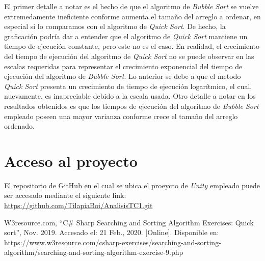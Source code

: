 \documentclass[conference]{IEEEtran}
\begin{document}
El primer detalle a notar es el hecho de que el algoritmo de \textit{Bubble Sort} se vuelve extremedamente ineficiente conforme
aumenta el tamaño del arreglo a ordenar, en especial si lo comparamos con el algoritmo de \textit{Quick Sort}. De hecho, la graficación
podría dar a entender que el algoritmo de \textit{Quick Sort} mantiene un tiempo de ejecución constante, pero este no es el caso. En realidad,
el crecimiento del tiempo de ejecución del algoritmo de \textit{Quick Sort} no se puede observar en las escalas requeridas para representar
el crecimiento exponencial del tiempo de ejecución del algoritmo de \textit{Bubble Sort}. Lo anterior se debe a que el metodo \textit{Quick Sort}
presenta un crecimiento de tiempo de ejecución logarítmico, el cual, nuevamente, es inapreciable debido a la escala usada.
Otro detalle a notar en los resultados obtenidos es que los tiempos de ejecución del algoritmo de \textit{Bubble Sort} empleado poseen 
una mayor varianza conforme crece el tamaño del arreglo ordenado.

\section{Acceso al proyecto}
El repositorio de GitHub en el cual se ubica el proeycto de \textit{Unity} empleado puede ser accesado mediante el siguiente link: \url{https://github.com/TilapiaBoi/AnalisisTC1.git}

\begin{thebibliography}{00}
 W3resource.com, ``C\# Sharp Searching and Sorting Algorithm Exercises: Quick sort'', Nov. 2019. Accesado el: 21 Feb., 2020. [Online]. Disponible en: https://www.w3resource.com/csharp-exercises/searching-and-sorting-algorithm/searching-and-sorting-algorithm-exercise-9.php
\end{thebibliography}
\end{document}
